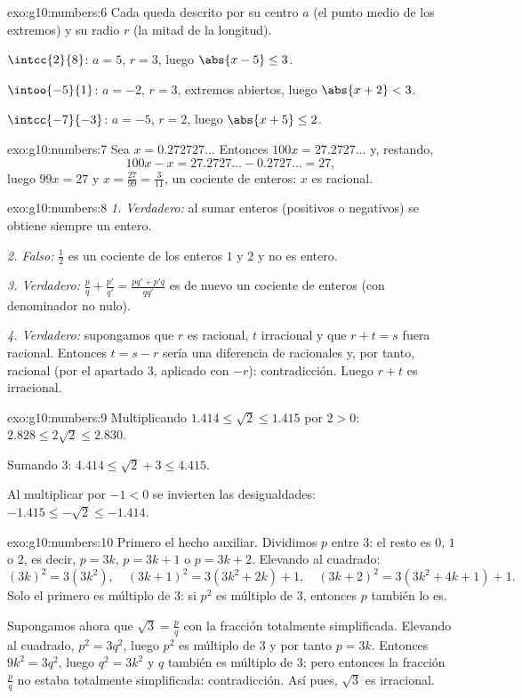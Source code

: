 \begin{solution}{exo:g10:numbers:6}
Cada  queda descrito por su centro $a$ (el punto medio de los
extremos) y su radio $r$ (la mitad de la longitud).

$\intcc{2}{8}$: $a = 5$, $r = 3$, luego $\abs{x - 5} \leq 3$.

$\intoo{-5}{1}$: $a = -2$, $r = 3$, extremos abiertos, luego
$\abs{x + 2} < 3$.

$\intcc{-7}{-3}$: $a = -5$, $r = 2$, luego $\abs{x + 5} \leq 2$.
\end{solution}

\begin{solution}{exo:g10:numbers:7}
Sea $x = 0.272727\dots$ Entonces $100x = 27.2727\dots$ y, restando,
\[
100x - x = 27.2727\dots - 0.2727\dots = 27,
\]
luego $99x = 27$ y $x = \frac{27}{99} = \frac{3}{11}$, un cociente de
enteros: $x$ es racional.
\end{solution}

\begin{solution}{exo:g10:numbers:8}
\emph{1. Verdadero:} al sumar enteros (positivos o negativos) se obtiene
siempre un entero.

\emph{2. Falso:} $\frac{1}{2}$ es un cociente de los enteros $1$ y $2$ y
no es entero.

\emph{3. Verdadero:} $\frac pq + \frac{p'}{q'} = \frac{pq' + p'q}{qq'}$ es
de nuevo un cociente de enteros (con denominador no nulo).

\emph{4. Verdadero:} supongamos que $r$ es racional, $t$ irracional y que
$r + t = s$ fuera racional. Entonces $t = s - r$ sería una diferencia de
racionales y, por tanto, racional (por el apartado 3, aplicado con $-r$):
contradicción. Luego $r + t$ es irracional.
\end{solution}

\begin{solution}{exo:g10:numbers:9}
Multiplicando $1.414 \leq \sqrt2 \leq 1.415$ por $2 > 0$:
$2.828 \leq 2\sqrt2 \leq 2.830$.

Sumando $3$: $4.414 \leq \sqrt2 + 3 \leq 4.415$.

Al multiplicar por $-1 < 0$ se invierten las desigualdades:
$-1.415 \leq -\sqrt2 \leq -1.414$.
\end{solution}

\begin{solution}{exo:g10:numbers:10}
Primero el hecho auxiliar. Dividimos $p$ entre $3$: el resto es $0$, $1$ o
$2$, es decir, $p = 3k$, $p = 3k+1$ o $p = 3k+2$. Elevando al cuadrado:
\[
(3k)^2 = 3(3k^2), \quad
(3k+1)^2 = 3(3k^2 + 2k) + 1, \quad
(3k+2)^2 = 3(3k^2 + 4k + 1) + 1 .
\]
Solo el primero es múltiplo de $3$: si $p^2$ es múltiplo de $3$, entonces
$p$ también lo es.

Supongamos ahora que $\sqrt3 = \frac pq$ con la fracción totalmente
simplificada. Elevando al cuadrado, $p^2 = 3q^2$, luego $p^2$ es múltiplo
de $3$ y por tanto $p = 3k$. Entonces $9k^2 = 3q^2$, luego $q^2 = 3k^2$ y
$q$ también es múltiplo de $3$; pero entonces la fracción $\frac pq$ no
estaba totalmente simplificada: contradicción. Así pues, $\sqrt3$ es
irracional.
\end{solution}

